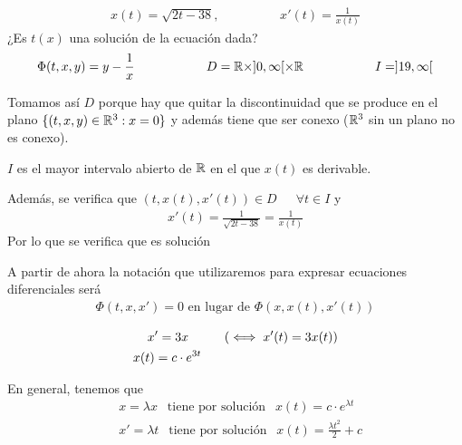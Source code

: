 \begin{ejemplo}
    \begin{gather*}
        x(t)=\sqrt{2t - 38}, 
        \hspace{2cm} 
        x'(t)=\frac{1}{x(t)}
    \end{gather*}
    ¿Es $t(x)$ una solución de la ecuación dada?
    \begin{gather*}
        \Phi(t,x,y)=y - \frac{1}{x}
        \hspace{2cm} 
        D=\mathbb{R}\times ]0,\infty[ \times \mathbb{R}
        \hspace{2cm} 
        I=]19, \infty[
    \end{gather*}

    Tomamos así $D$ porque hay que quitar la discontinuidad que se produce en el plano $\{(t,x,y)\in \mathbb{R}^3 : x=0\}$ y además tiene que ser conexo ($\mathbb{R}^3$ sin un plano no es conexo).

    $I$ es el mayor intervalo abierto de $\mathbb{R}$ en el que $x(t)$ es derivable.

    Además, se verifica que $(t,x(t),x'(t))\in D$\ \ \ $\forall t \in I$ y 
    \begin{gather*}
        x'(t)=\frac{1}{\sqrt{2t-38}}=\frac{1}{x(t)}
    \end{gather*}
    Por lo que se verifica que es solución

\end{ejemplo}

A partir de ahora la notación que utilizaremos para expresar ecuaciones diferenciales será
\begin{gather*}
    \Phi(t,x,x') = 0 \text{ en lugar de } \Phi(x, x(t), x'(t))
\end{gather*}

\begin{ejemplo}
    \begin{align*}
        x&'=3x \hspace{1cm} (\iff x'(t)=3x(t))\\
        x(t)&=c \cdot e^{3t}
    \end{align*}

    En general, tenemos que
    \begin{align*}
        &x = \lambda x  \ \ \text{ tiene por solución }\ \  x(t)=c \cdot e ^{\lambda t}\\
        &x'=\lambda t\ \  \text{ tiene por solución }\ \  x(t)=\frac{\lambda t^2}{2} +c
    \end{align*}

\end{ejemplo}

